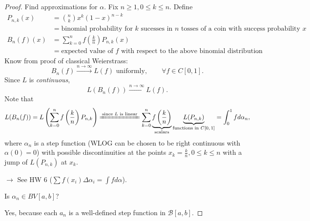 \documentclass[letterpaper, reqno,11pt]{article}
\begin{document}
\begin{proof}
   Find approximations for $\alpha$. Fix $n \geq 1, 0 \leq k \leq n$. Define
  \begin{align*}
    P_{n, k}(x) &= \binom{n}{k} x^k (1 - x)^{n - k} \\
    &= \text{binomial probability for $k$ sucesses in $n$ tosses of a coin with success probability $x$}, \\
    B_n(f)(x) &= \sum_{k = 0}^n f\left(\frac{k}{n}\right) P_{n, k}(x) \\
    &= \text{expected value of $f$ with respect to the above binomial distribution}.
  \end{align*}
  Know from proof of classical Weierstrass:
  \[ B_n(f) \xrightarrow{n \to \infty} L(f) \text{ uniformly}, \qquad \forall f \in C[0, 1]. \]
  Since $L$ is \emph{continuous},
  \[ L(B_n(f)) \xrightarrow{n \to \infty} L(f). \]
  Note that
  \[ L(B_n(f)) = L\left(\sum_{k = 0}^n f\left(\frac{k}{n}\right) P_{n, k}\right) \xlongequal{\text{since $L$ is linear}} \sum_{k = 0}^n \underbrace{f\left(\frac{k}{n}\right)}_\text{scalars} \underbrace{L(P_{n, k})}_\text{functions in $C[0, 1]$} = \int_0^1 fd\alpha_n, \]
  where $\alpha_n$ is a step function (WLOG can be chosen to be right continuous with $\alpha(0) = 0$) with possible discontinuities at the points $x_k = \frac{k}{n}, 0 \leq k \leq n$ with a jump of $L(P_{n, k})$ at $x_k$.

  \noindent $\rightarrow$ See HW 6 ($\sum f(x_i) \Delta \alpha_i = \int fd\alpha$).

  \medskip

   Is $\alpha_n \in BV[a, b]$?
  
  \noindent Yes, because each $a_n$ is a well-defined step function in $\mathcal B[a, b]$.


\end{proof}
\end{document}
